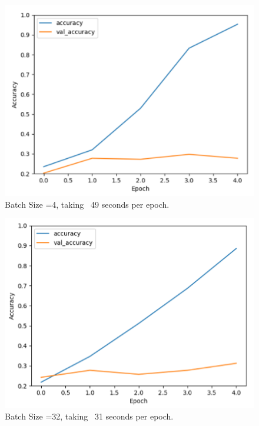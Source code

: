 \begin{figure}[H]
\centering
\includegraphics[scale=1.0]{Media/Testing/fig3.png}
\caption{Batch Size =4, taking ~49 seconds per epoch.}
\label{fig3}
\end{figure}

\begin{figure}[H]
\centering
\includegraphics[scale=1.0]{Media/Testing/fig4.png}
\caption{Batch Size =32, taking ~31 seconds per epoch.}
\label{fig4}
\end{figure}

